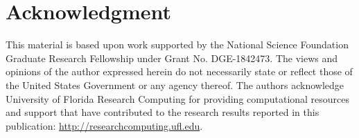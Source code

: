 \documentclass[journal]{IEEEtai}
\begin{document}
\section*{Acknowledgment}
This material is based upon work supported by the National Science Foundation Graduate Research Fellowship under Grant No. DGE-1842473. The views and opinions of the author expressed herein do not necessarily state or reflect those of the United States Government or any agency thereof. The authors acknowledge University of Florida Research Computing for providing computational resources and support that have contributed to the research results reported in this publication: \url{http://researchcomputing.ufl.edu}.  


\ifCLASSOPTIONcaptionsoff
  \newpage
\fi



\printbibliography
\end{document}
